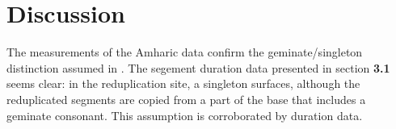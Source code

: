 \documentclass[12pt]{scrartcl}
\begin{document}







\section{Discussion}

The measurements of the Amharic data confirm the geminate/singleton distinction assumed in \cite{sande2017}. The segement duration data presented in section \textbf{3.1} seems clear: in the reduplication site, a singleton surfaces, although the reduplicated segments are copied from a part of the base that includes a geminate consonant. This assumption is corroborated by duration data.
\end{document}
